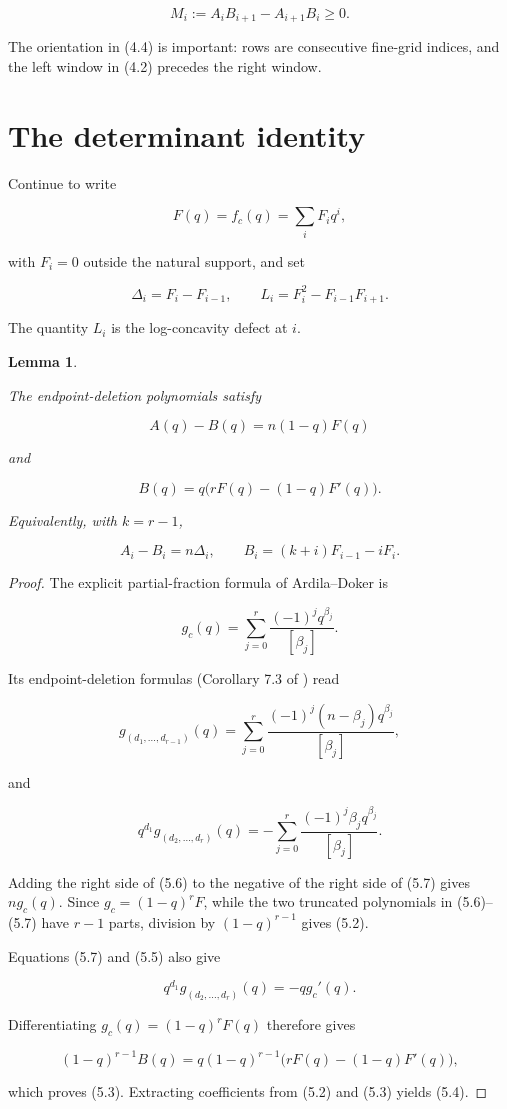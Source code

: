 \documentclass[11pt]{article}
\newtheorem{lemma}[theorem]{Lemma}
\begin{document}
\[
M_i:=A_iB_{i+1}-A_{i+1}B_i\geq0.
\tag{4.4}
\]

The orientation in (4.4) is important: rows are consecutive fine-grid indices, and the left window
in (4.2) precedes the right window.

\section{The determinant identity}


Continue to write

\[
F(q)=f_c(q)=\sum_iF_iq^i,
\]

with $F_i=0$ outside the natural support, and set

\[
\Delta_i=F_i-F_{i-1},
\qquad
L_i=F_i^2-F_{i-1}F_{i+1}.
\tag{5.1}
\]

The quantity $L_i$ is the log-concavity defect at $i$.

\Needspace{0.18\textheight}
\begin{lemma}
\label{lem:endpoint}

The endpoint-deletion polynomials satisfy

\[
A(q)-B(q)=n(1-q)F(q)
\tag{5.2}
\]

and

\[
B(q)=q\bigl(rF(q)-(1-q)F'(q)\bigr).
\tag{5.3}
\]

Equivalently, with $k=r-1$,

\[
A_i-B_i=n\Delta_i,
\qquad
B_i=(k+i)F_{i-1}-iF_i.
\tag{5.4}
\]

\end{lemma}

\begin{proof}

The explicit partial-fraction formula of Ardila--Doker is

\[
g_c(q)=\sum_{j=0}^r\frac{(-1)^jq^{\beta_j}}{[\beta_j]}.
\tag{5.5}
\]

Its endpoint-deletion formulas (Corollary 7.3 of \cite{ardila-doker}) read

\[
g_{(d_1,\ldots,d_{r-1})}(q)
=\sum_{j=0}^r
\frac{(-1)^j(n-\beta_j)q^{\beta_j}}{[\beta_j]},
\tag{5.6}
\]

and

\[
q^{d_1}g_{(d_2,\ldots,d_r)}(q)
=-\sum_{j=0}^r
\frac{(-1)^j\beta_jq^{\beta_j}}{[\beta_j]}.
\tag{5.7}
\]

Adding the right side of (5.6) to the negative of the right side of (5.7) gives $ng_c(q)$.
Since $g_c=(1-q)^rF$, while the two truncated polynomials in (5.6)--(5.7) have $r-1$ parts,
division by $(1-q)^{r-1}$ gives (5.2).

Equations (5.7) and (5.5) also give

\[
q^{d_1}g_{(d_2,\ldots,d_r)}(q)=-qg_c'(q).
\]

Differentiating $g_c(q)=(1-q)^rF(q)$ therefore gives

\[
(1-q)^{r-1}B(q)
=q(1-q)^{r-1}\bigl(rF(q)-(1-q)F'(q)\bigr),
\]

which proves (5.3). Extracting coefficients from (5.2) and (5.3) yields (5.4).
\end{proof}
\end{document}
